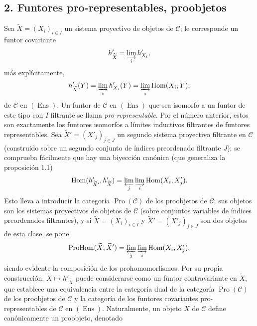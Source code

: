 \subsection*{2. Funtores pro-representables, proobjetos}

Sea $\widetilde X=(X_i)_{i\in I}$ un sistema proyectivo de objetos de
$\mathcal C$; le corresponde un funtor covariante
\[
  h'_{\widetilde X}=\varinjlim_i h'_{X_i},
\]
más explícitamente,
\[
  h'_{\widetilde X}(Y)=\varinjlim_i h'_{X_i}(Y)
  =\varinjlim_i\operatorname{Hom}(X_i,Y),
\]
de $\mathcal C$ en $(\operatorname{Ens})$. Un funtor de $\mathcal C$ en
$(\operatorname{Ens})$ que sea isomorfo a un funtor de este tipo con $I$
filtrante se llama \emph{pro-representable}. Por el número anterior, estos son
exactamente los funtores isomorfos a límites inductivos filtrantes de funtores
representables. Sea $\widetilde X'=(X'_j)_{j\in J}$ un segundo sistema
proyectivo filtrante en $\mathcal C$ (construido sobre un segundo conjunto de
índices preordenado filtrante $J$); se comprueba fácilmente que hay una
biyección canónica (que generaliza la proposición 1.1)
\[
  \operatorname{Hom}(h'_{\widetilde X'},h'_{\widetilde X})
  =\varprojlim_j\varinjlim_i\operatorname{Hom}(X_i,X'_j).
\]
Esto lleva a introducir la categoría $\operatorname{Pro}(\mathcal C)$ de los
proobjetos de $\mathcal C$; sus objetos son los sistemas proyectivos de objetos
de $\mathcal C$ (sobre conjuntos variables de índices preordenados filtrantes),
y si $\widetilde X=(X_i)_{i\in I}$ y
$\widetilde X'=(X'_j)_{j\in J}$ son dos objetos de esta clase, se pone
\[
  \operatorname{ProHom}(\widetilde X,\widetilde X')
  =\varprojlim_j\varinjlim_i\operatorname{Hom}(X_i,X'_j),
\]
siendo evidente la composición de los prohomomorfismos. Por su propia
construcción, $\widetilde X\longmapsto h'_{\widetilde X}$ puede considerarse
como un funtor contravariante en $\widetilde X$, que establece una equivalencia
entre la categoría dual de la categoría $\operatorname{Pro}(\mathcal C)$ de
los proobjetos de $\mathcal C$ y la categoría de los funtores covariantes
pro-representables de $\mathcal C$ en $(\operatorname{Ens})$. Naturalmente, un
objeto $X$ de $\mathcal C$ define canónicamente un proobjeto, denotado

